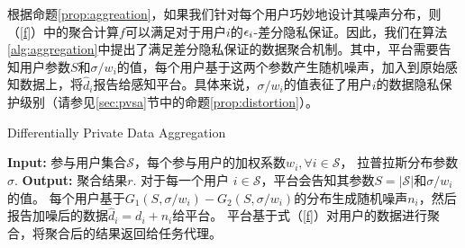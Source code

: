 	\vspace{-0.2cm}
	根据命题\ref{prop:aggreation}，如果我们针对每个用户巧妙地设计其噪声分布，则（\ref{f}）中的聚合计算$f$可以满足对于用户$i$的$\epsilon_i$-差分隐私保证。因此，我们在算法\ref{alg:aggregation}中提出了满足差分隐私保证的数据聚合机制。其中，平台需要告知用户参数$S$和$\sigma/w_i$的值，每个用户基于这两个参数产生随机噪声，加入到原始感知数据上，将$\hat{d}_i$报告给感知平台。具体来说，$\sigma/w_i$的值表征了用户$i$的数据隐私保护级别（请参见\ref{sec:pvsa}节中的命题\ref{prop:distortion}）。
	
	\begin{algorithm}
		\caption{Differentially Private Data Aggregation}
		\label{alg:aggregation}
		\begin{algorithmic}[1]
			\STATE \textbf{Input:} 参与用户集合$\mathcal{S}$，每个参与用户的加权系数$w_i, \forall i\in\mathcal{S}$， 拉普拉斯分布参数$\sigma$.
			\STATE \textbf{Output:} 聚合结果$r$.
			\STATE 对于每一个用户 $i\in\mathcal{S}$，平台会告知其参数$S=|\mathcal{S}|$和$\sigma/w_i$的值。
			\STATE 每个用户基于$G_1(S,\sigma/w_i)-G_2(S,\sigma/w_i)$的分布生成随机噪声$n_i$，然后报告加噪后的数据$\hat{d}_i=d_i+n_i$给平台。
			\STATE 平台基于式（\ref{f}）对用户的数据进行聚合，将聚合后的结果返回给任务代理。%
		\end{algorithmic}
	\end{algorithm}
	
